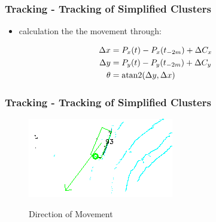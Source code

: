 \documentclass[nosymbols]{beamer}	%
\begin{document}
\begin{frame}
\frametitle{Tracking - Tracking of Simplified Clusters}
\begin{itemize}
    \item calculation the the movement through:
  \end{itemize}
  \begin{align*}
    \Delta x &= P_x(t) - P_x(t_{-2m}) + \Delta C_x\\
    \Delta y &= P_y(t) - P_y(t_{-2m}) + \Delta C_y\\
    \theta &= \operatorname{atan2}(\Delta y,\Delta x)
  \end{align*}
\end{frame}



\begin{frame}
\frametitle{Tracking - Tracking of Simplified Clusters}
\begin{figure}[!ht]
\caption{Direction of Movement}
\includegraphics[width=\textwidth,height=0.7\textheight,keepaspectratio]{bilder/obst_rot.png}
\label{segments}
\end{figure}
\end{frame}
\end{document}
